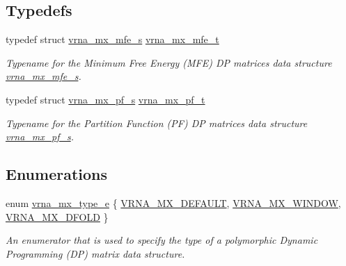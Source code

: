 \subsection*{Typedefs}
\begin{DoxyCompactItemize}
\item 
\hypertarget{group__dp__matrices_gae5aef35d016475e758f619b7bcb534f9}{typedef struct \hyperlink{group__dp__matrices_structvrna__mx__mfe__s}{vrna\-\_\-mx\-\_\-mfe\-\_\-s} \hyperlink{group__dp__matrices_gae5aef35d016475e758f619b7bcb534f9}{vrna\-\_\-mx\-\_\-mfe\-\_\-t}}\label{group__dp__matrices_gae5aef35d016475e758f619b7bcb534f9}

\begin{DoxyCompactList}\small\item\em Typename for the Minimum Free Energy (M\-F\-E) D\-P matrices data structure \hyperlink{group__dp__matrices_structvrna__mx__mfe__s}{vrna\-\_\-mx\-\_\-mfe\-\_\-s}. \end{DoxyCompactList}\item 
\hypertarget{group__dp__matrices_ga68729ab3fed26bdd1806fa814f172fc1}{typedef struct \hyperlink{group__dp__matrices_structvrna__mx__pf__s}{vrna\-\_\-mx\-\_\-pf\-\_\-s} \hyperlink{group__dp__matrices_ga68729ab3fed26bdd1806fa814f172fc1}{vrna\-\_\-mx\-\_\-pf\-\_\-t}}\label{group__dp__matrices_ga68729ab3fed26bdd1806fa814f172fc1}

\begin{DoxyCompactList}\small\item\em Typename for the Partition Function (P\-F) D\-P matrices data structure \hyperlink{group__dp__matrices_structvrna__mx__pf__s}{vrna\-\_\-mx\-\_\-pf\-\_\-s}. \end{DoxyCompactList}\end{DoxyCompactItemize}
\subsection*{Enumerations}
\begin{DoxyCompactItemize}
\item 
enum \hyperlink{group__dp__matrices_ga6042ea1d58d01931e959791be6d89343}{vrna\-\_\-mx\-\_\-type\-\_\-e} \{ \hyperlink{group__dp__matrices_gga6042ea1d58d01931e959791be6d89343aafa2568956dab79595521e20c49a5f75}{V\-R\-N\-A\-\_\-\-M\-X\-\_\-\-D\-E\-F\-A\-U\-L\-T}, 
\hyperlink{group__dp__matrices_gga6042ea1d58d01931e959791be6d89343a2ea5d5947f6ec02544934b0ff2785e99}{V\-R\-N\-A\-\_\-\-M\-X\-\_\-\-W\-I\-N\-D\-O\-W}, 
\hyperlink{group__dp__matrices_gga6042ea1d58d01931e959791be6d89343ae656f8391445ff71bed8a597a0a19417}{V\-R\-N\-A\-\_\-\-M\-X\-\_\-D\-F\-O\-L\-D}
 \}
\begin{DoxyCompactList}\small\item\em An enumerator that is used to specify the type of a polymorphic Dynamic Programming (D\-P) matrix data structure. \end{DoxyCompactList}\end{DoxyCompactItemize}
